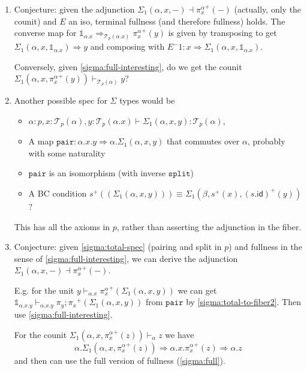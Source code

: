 \documentclass[10pt]{article}
\theoremstyle{definition}
\newcommand{\tcell}{\Rightarrow}
\newcommand{\id}{\mathsf{id}}
\newcommand\TrPlus[2]{\ensuremath{{#1}^+(#2)}}
\newcommand\El[2]{\mathcal{T}_{#1}(#2)}
\newcommand\One{\ensuremath{\mathds{1}}}
\newcommand\mtt[1]{\mathtt{#1}}
\begin{document}
\begin{enumerate}
\item Conjecture: given the adjunction $\Sigma_1(\alpha,x,-) \dashv
  \TrPlus{\pi^\alpha_x}{-}$ (actually, only the counit) and $E$ an iso,
  terminal fullness (and therefore fullness) holds.  The converse map
  for $\One_{\alpha.x} \tcell_{\El{p}{\alpha.x}} \TrPlus{\pi^\alpha_x}{y}$
  is given by transposing to get $\Sigma_1(\alpha,x,\One_{\alpha.x}) \tcell
  y$ and composing with $E^-1 : x \tcell
  \Sigma_1(\alpha,x,\One_{\alpha.x})$.

  Conversely, given \ref{sigma:full-interesting}, do we get the counit
  $\Sigma_1(\alpha,x,\TrPlus{\pi^\alpha_x}{y}) \vdash_{\El{p}{\alpha}} y$?

\item \label{sigma:total-spec} Another possible spec for $\Sigma$ types
  would be
  \begin{itemize}
  \item $\alpha : p, x : \El{p}{\alpha}, y : \El{p}{\alpha.x} \vdash \Sigma_1(\alpha,x,y) : \El{p}{\alpha}$,
  \item A map $\mtt{pair} : \alpha.x.y \tcell
    \alpha.\Sigma_1(\alpha,x,y)$ that commutes over $\alpha$, probably
    with some naturality
  \item $\mtt{pair}$ is an isomorphism (with inverse $\mtt{split}$)
  \item A BC condition $\TrPlus{s}{(\Sigma_1(\alpha,x,y))} \equiv
    \Sigma_1(\beta,\TrPlus{s}{x}, \TrPlus{(s . \id)}{y})$?
  \end{itemize}

  This has all the axioms in $p$, rather than asserting the adjunction
  in the fiber.

\item Conjecture: given \ref{sigma:total-spec} (pairing and split in
  $p$) and fullness in the sense of \ref{sigma:full-interesting}, we
  can derive the adjunction $\Sigma_1(\alpha,x,-) \dashv
  \TrPlus{\pi^\alpha_x}{-}$.

  E.g. for the unit $y \vdash_{\alpha.x} \TrPlus{\pi^\alpha_x}{\Sigma_1(\alpha,x,y)}$
  we can get
  $\One_{\alpha.x.y} \vdash_{\alpha.x.y} \TrPlus{\pi_y;\pi_x}{\Sigma_1(\alpha,x,y)}$
  from $\mtt{pair}$ by \ref{sigma:total-to-fiber2}.
  Then use \ref{sigma:full-interesting}.  

  For the counit
  $\Sigma_1(\alpha,x,\TrPlus{\pi^\alpha_x}{z}) \vdash_{\alpha} z$
  we have
  \[
  \alpha.\Sigma_1(\alpha,x,\TrPlus{\pi^\alpha_x}{z}) \tcell \alpha.x.\TrPlus{\pi^\alpha_x}{z} \tcell \alpha.z 
  \]
  and then can use the full version of fullness (\ref{sigma:full}).    


\end{enumerate}
\end{document}
